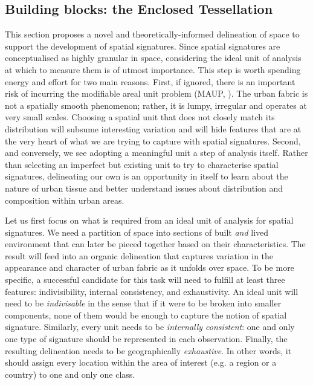 \subsection{Building blocks: the Enclosed Tessellation}
\label{ssec:ss_et}

This section proposes a novel and theoretically-informed delineation of space to
support the development of spatial signatures.
Since spatial signatures are conceptualised as highly granular in space,
considering the ideal unit of analysis at which to measure them is of utmost
importance.
%
This step is worth spending energy and effort for two main reasons.
First, if ignored, there is an important risk of incurring the modifiable areal
unit problem (MAUP, \citealp{openshaw1981modifiable}). The urban fabric is not a
spatially smooth phenomenon; rather, it is lumpy, irregular and operates at very
small scales.
%
Choosing a spatial unit that does not closely match its distribution will
subsume interesting variation and will hide features that are at the very heart
of what we are trying to capture with spatial signatures.
Second, and conversely, we see adopting a meaningful unit a step of analysis
itself. Rather than selecting an imperfect but existing unit to try to
characterise spatial signatures, delineating our own is an opportunity in itself
to learn about the nature of urban tissue and better understand issues about
distribution and composition within urban areas.

Let us first focus on what is required from an ideal unit of analysis for
spatial signatures. We need a partition of space into sections of built
\textit{and} lived environment that can later be pieced together based on their
characteristics. The result will feed into an organic delineation that captures
variation in the appearance and character of urban fabric as it unfolds over
space.
%
To be more specific, a successful candidate for this task will need to fulfill
at least three features: indivisibility, internal consistency, and exhaustivity.
An ideal unit will need to be \textit{indivisable} in the sense that if it were
to be broken into smaller components, none of them would be enough to capture
the notion of spatial signature.
Similarly, every unit needs to be \textit{internally consistent}: one and only
one type of signature should be represented in each observation.
Finally, the resulting delineation needs to be geographically
\textit{exhaustive}. In other words, it should assign every location within the
area of interest (e.g. a region or a country) to one and only one class.

